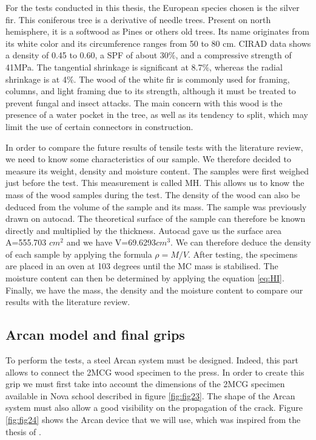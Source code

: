 For the tests conducted in this thesis, the European species chosen is the silver fir. This coniferous tree is a derivative of needle trees.  Present on north hemisphere, it is a softwood as Pines or others old trees. Its name originates from its white color and its circumference ranges from 50 to 80 cm. CIRAD data shows a density of 0.45 to 0.60, a SPF of about 30$\%$, and a compressive strength of 41MPa. The tangential shrinkage is significant at 8.7$\%$, whereas the radial shrinkage is at 4$\%$. The wood of the white fir is commonly used for framing, columns, and light framing due to its strength, although it must be treated to prevent fungal and insect attacks. The main concern with this wood is the presence of a water pocket in the tree, as well as its tendency to split, which may limit the use of certain connectors in construction.

In order to compare the future results of tensile tests with the literature review, we need to know some characteristics of our sample.
We therefore decided to measure its weight, density and moisture content.
The samples were first weighed just before the test. This measurement is called MH. 
This allows us to know the mass of the wood samples during the test.
The density of the wood can also be deduced from the volume of the sample and its mass.
The sample was previously drawn on autocad. The theoretical surface of the sample can therefore be known directly and multiplied by the thickness.
Autocad gave us the surface area A=555.703 $cm^2$ and we have V=69.6293$cm^3$.
We can therefore deduce the density of each sample by applying the formula $\rho=M/V$.
After testing, the specimens are placed in an oven at 103 degrees until the MC mass is stabilised.
The moisture content can then be determined by applying the equation \ref{eq:HI}.
Finally, we have the mass, the density and the moisture content to compare our results with the literature review.

\subsection{Arcan model and final grips}

To perform the tests, a steel Arcan system must be designed. Indeed, this part allows to connect the 2MCG wood specimen to the press. In order to create this grip we must first take into account the dimensions of the 2MCG specimen available in Nova school described in figure \ref{fig:fig23}. The shape of the Arcan system must also allow a good visibility on the propagation of the crack. Figure \ref{fig:fig24} shows the Arcan device that we will use, which was inspired from the thesis of \cite{Odounga2018phd}.


